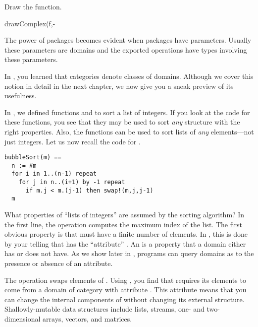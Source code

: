 \begin{psXtc}
\begin{xtccomment}
Draw the  function.
\end{xtccomment}
\begin{spadsrc}
drawComplex(f,-%
\end{spadsrc}
\end{psXtc}

%
The power of packages becomes evident when packages have parameters.
Usually these parameters are domains and the exported operations have types
involving these parameters.

In , you learned that categories denote classes of
domains.
Although we cover this notion in detail in the next
chapter, we now give you a sneak preview of its usefulness.

In , we defined functions  and
 to sort a list of integers.
If you look at the code for these functions, you see that they may be
used to sort {\it any} structure  with the right properties.
Also, the functions can be used to sort lists of {\it any} elements---not
just integers.
Let us now recall the code for .

\begin{verbatim}
bubbleSort(m) ==
  n := #m
  for i in 1..(n-1) repeat
    for j in n..(i+1) by -1 repeat
      if m.j < m.(j-1) then swap!(m,j,j-1)
  m
\end{verbatim}

What properties of ``lists of integers'' are assumed by the sorting
algorithm?
In the first line, the operation \spadop{#} computes the maximum index of
the list.
The first obvious property is that  must have a finite number of
elements.
In \Language{}, this is done
by your telling \Language{} that  has
the ``attribute'' .
An  is a property
that a domain either has or does not have.
As we show later in ,
programs can query domains as to the presence or absence of an attribute.

The operation  swaps elements of .
Using \Browse{}, you find that  requires its
elements to come from a domain of category
 with attribute
.
This attribute means that you can change the internal components
of  without changing its external structure.
Shallowly-mutable data structures include lists, streams, one- and
two-dimensional arrays, vectors, and matrices.

